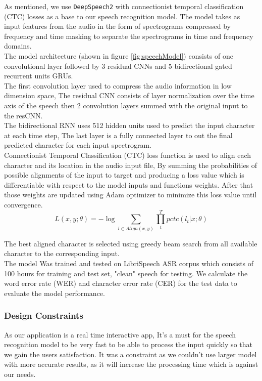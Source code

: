 As mentioned, we use \texttt{DeepSpeech2} with connectionist temporal classification (CTC) losses as a base to our speech recognition model. The model takes as input features from the audio in the form of spectrograms compressed by frequency and time masking to separate the spectrograms in time and frequency domains. \\
The model architecture (shown in figure \ref{fig:speechModel}) consists of one convolutional layer followed by 3 residual CNNs and 5 bidirectional gated recurrent units GRUs. \\

The first convolution layer used to compress the audio information in low dimension space, The residual CNN consists of layer normalization over the time axis of the speech then 2 convolution layers summed with the original input to the resCNN. \\

The bidirectional RNN uses 512 hidden units used to predict the input character at each time step, The last layer is a fully connected layer to out the final predicted character for each input spectrogram. \\

Connectionist Temporal Classification (CTC) loss function is used to align each character and its location in the audio input file, By summing the probabilities of possible alignments of the input to target and producing a loss value which is differentiable with respect to the model inputs and functions weights. After that those weights are updated using Adam optimizer to minimize this loss value until convergence. \\
\begin{equation}
    L(x,y;\theta) = - \log \sum_{l 	\in Align(x,y)}^{} \prod_{t}^{T} pctc (l_{t} |x;\theta )
\end{equation}

The best aligned character is selected using greedy beam search from all available character to the corresponding input. \\ 
The model Was trained and tested on LibriSpeech ASR corpus which consists of 100 hours for training and test set, "clean" speech for testing. We calculate the word error rate (WER) and character error rate (CER) for the test data to evaluate the model performance.


\subsubsection{Design Constraints}

As our application is a real time interactive app, It’s a must for the speech recognition model to be very fast to be able to process the input quickly so that we gain the users satisfaction. It was a constraint as we couldn't  use larger model with more accurate results, as it will increase the processing time which is against our needs.

